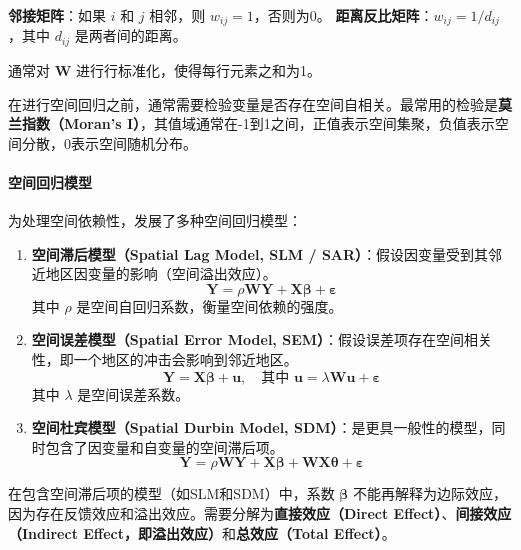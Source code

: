 \textbf{邻接矩阵}：如果 $i$ 和 $j$ 相邻，则 $w_{ij}=1$，否则为0。
\textbf{距离反比矩阵}：$w_{ij} = 1/d_{ij}$，其中 $d_{ij}$ 是两者间的距离。

通常对 $\mathbf{W}$ 进行行标准化，使得每行元素之和为1。

在进行空间回归之前，通常需要检验变量是否存在空间自相关。最常用的检验是\textbf{莫兰指数（Moran's I）}，其值域通常在-1到1之间，正值表示空间集聚，负值表示空间分散，0表示空间随机分布。

\paragraph*{空间回归模型}
为处理空间依赖性，发展了多种空间回归模型：
\begin{enumerate}
    \item \textbf{空间滞后模型（Spatial Lag Model, SLM / SAR）}：假设因变量受到其邻近地区因变量的影响（空间溢出效应）。
    \begin{equation}
    \mathbf{Y} = \rho \mathbf{W}\mathbf{Y} + \mathbf{X}\boldsymbol{\beta} + \boldsymbol{\varepsilon}
    \end{equation}
    其中 $\rho$ 是空间自回归系数，衡量空间依赖的强度。

    \item \textbf{空间误差模型（Spatial Error Model, SEM）}：假设误差项存在空间相关性，即一个地区的冲击会影响到邻近地区。
    \begin{equation}
    \mathbf{Y} = \mathbf{X}\boldsymbol{\beta} + \mathbf{u}, \quad \text{其中 } \mathbf{u} = \lambda \mathbf{W}\mathbf{u} + \boldsymbol{\varepsilon}
    \end{equation}
    其中 $\lambda$ 是空间误差系数。

    \item \textbf{空间杜宾模型（Spatial Durbin Model, SDM）}：是更具一般性的模型，同时包含了因变量和自变量的空间滞后项。
    \begin{equation}
    \mathbf{Y} = \rho \mathbf{W}\mathbf{Y} + \mathbf{X}\boldsymbol{\beta} + \mathbf{W}\mathbf{X}\boldsymbol{\theta} + \boldsymbol{\varepsilon}
    \end{equation}
\end{enumerate}

在包含空间滞后项的模型（如SLM和SDM）中，系数 $\boldsymbol{\beta}$ 不能再解释为边际效应，因为存在反馈效应和溢出效应。需要分解为\textbf{直接效应（Direct Effect）}、\textbf{间接效应（Indirect Effect，即溢出效应）}和\textbf{总效应（Total Effect）}。

